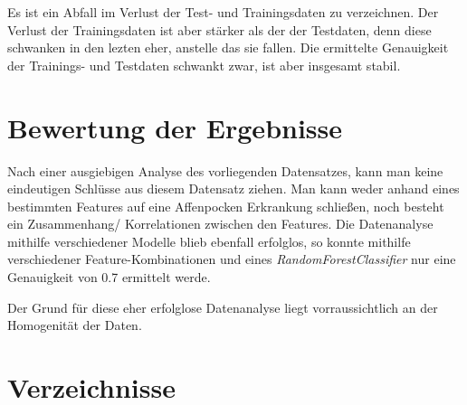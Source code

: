 \documentclass[13pt,a4paper, listof=entryprefix, bibliography=totocnumbered,toc=listofnumbered,lof=listofnumbered]{scrartcl}
\newcounter{verzeichnis}
\begin{document}
Es ist ein Abfall im Verlust der Test- und Trainingsdaten zu verzeichnen. Der Verlust der Trainingsdaten ist aber stärker als der der 
Testdaten, denn diese schwanken in den lezten eher, anstelle das sie fallen. Die ermittelte Genauigkeit der Trainings- und Testdaten 
schwankt zwar, ist aber insgesamt stabil. 


	\section{Bewertung der Ergebnisse}
		\label{ch:bewertungs_ergebnisse}

Nach einer ausgiebigen Analyse des vorliegenden Datensatzes, kann man keine eindeutigen Schlüsse aus diesem Datensatz ziehen.
Man kann weder anhand eines bestimmten Features auf eine Affenpocken Erkrankung schließen, noch besteht ein Zusammenhang/ Korrelationen
zwischen den Features. Die Datenanalyse mithilfe verschiedener Modelle blieb ebenfall erfolglos, so konnte mithilfe verschiedener 
Feature-Kombinationen und eines \textit{RandomForestClassifier} nur eine Genauigkeit von 0.7 ermittelt werde.

Der Grund für diese eher erfolglose Datenanalyse liegt vorraussichtlich an der Homogenität der Daten. 



		\pagebreak

		 \label{Verzeichnisse}
		\renewcommand{\thesection}{\Roman{verzeichnis}}
		\section*{Verzeichnisse} 
   		 \label{Literaturverzeichnis}
		\renewcommand{\refname}{Literaturverzeichnis}
		\printbibliography
		\pagebreak

		\listoffigures
		\pagebreak


		\listoftables
		\pagebreak

        \lstlistoflistings
        \pagebreak
\end{document}
